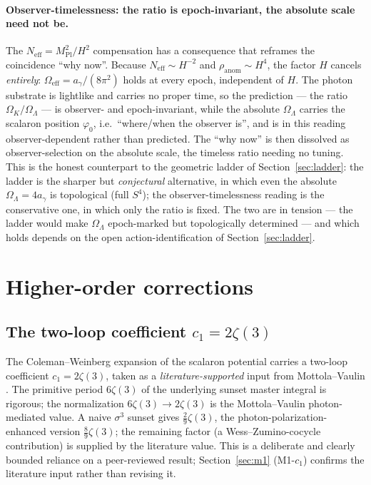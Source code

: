 \documentclass[11pt,a4paper]{article}
\theoremstyle{plain}
\theoremstyle{definition}
\theoremstyle{remark}
\newcommand{\Ok}{\Omega_K}
\newcommand{\OL}{\Omega_\Lambda}
\newcommand{\ag}{a_\gamma}
\newcommand{\Mpl}{M_{\mathrm{Pl}}}
\begin{document}
\paragraph{Observer-timelessness: the ratio is epoch-invariant, the absolute scale need not be.}
The $N_{\mathrm{eff}} = \Mpl^2/H^2$ compensation has a consequence that reframes the coincidence
``why now''. Because $N_{\mathrm{eff}}\sim H^{-2}$ and $\rho_{\mathrm{anom}}\sim H^4$, the factor
$H$ cancels \emph{entirely}: $\Omega_{\mathrm{eff}} = \ag/(8\pi^2)$ holds at every epoch,
independent of $H$. The photon substrate is lightlike and carries no proper time, so the
prediction --- the ratio $\Ok/\OL$ --- is observer- and epoch-invariant, while the absolute $\OL$
carries the scalaron position $\varphi_0$, i.e.\ ``where/when the observer is'', and is in this
reading observer-dependent rather than predicted. The ``why now'' is then dissolved as
observer-selection on the absolute scale, the timeless ratio needing no tuning. This is the
honest counterpart to the geometric ladder of Section~\ref{sec:ladder}: the ladder is the
sharper but \emph{conjectural} alternative, in which even the absolute $\OL = 4\ag$ is topological
(full $S^4$); the observer-timelessness reading is the conservative one, in which only the ratio
is fixed. The two are in tension --- the ladder would make $\OL$ epoch-marked but topologically
determined --- and which holds depends on the open action-identification of
Section~\ref{sec:ladder}.

\section{Higher-order corrections}
\label{sec:corrections}

\subsection{The two-loop coefficient $c_1 = 2\zeta(3)$}
The Coleman--Weinberg expansion of the scalaron potential carries a two-loop coefficient
$c_1 = 2\zeta(3)$, taken as a \emph{literature-supported} input from Mottola--Vaulin
\cite{MottolaVaulin2006}. The primitive period $6\zeta(3)$ of the underlying sunset master
integral is rigorous; the normalization $6\zeta(3) \to 2\zeta(3)$ is the Mottola--Vaulin
photon-mediated value. A naive $\sigma^3$ sunset gives $\tfrac29\zeta(3)$, the
photon-polarization-enhanced version $\tfrac89\zeta(3)$; the remaining factor (a
Wess--Zumino-cocycle contribution) is supplied by the literature value. This is a deliberate and
clearly bounded reliance on a peer-reviewed result; Section~\ref{sec:m1} (M1-$c_1$) confirms the
literature input rather than revising it.
\end{document}
